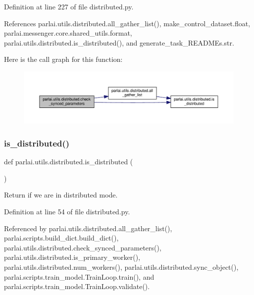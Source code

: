 Definition at line 227 of file distributed.\+py.



References parlai.\+utils.\+distributed.\+all\+\_\+gather\+\_\+list(), make\+\_\+control\+\_\+dataset.\+float, parlai.\+messenger.\+core.\+shared\+\_\+utils.\+format, parlai.\+utils.\+distributed.\+is\+\_\+distributed(), and generate\+\_\+task\+\_\+\+R\+E\+A\+D\+M\+Es.\+str.

Here is the call graph for this function\+:
\nopagebreak
\begin{figure}[H]
\begin{center}
\leavevmode
\includegraphics[width=350pt]{namespaceparlai_1_1utils_1_1distributed_afc64140f9a6437dc1a2b2bd4294ba8ef_cgraph}
\end{center}
\end{figure}
\mbox{\label{namespaceparlai_1_1utils_1_1distributed_a023acb5e3b66e1f27e21247c35661279}} 
\subsubsection{\texorpdfstring{is\+\_\+distributed()}{is\_distributed()}}
{\footnotesize\ttfamily def parlai.\+utils.\+distributed.\+is\+\_\+distributed (\begin{DoxyParamCaption}{ }\end{DoxyParamCaption})}

\begin{DoxyVerb}Return if we are in distributed mode.\end{DoxyVerb}
 

Definition at line 54 of file distributed.\+py.



Referenced by parlai.\+utils.\+distributed.\+all\+\_\+gather\+\_\+list(), parlai.\+scripts.\+build\+\_\+dict.\+build\+\_\+dict(), parlai.\+utils.\+distributed.\+check\+\_\+synced\+\_\+parameters(), parlai.\+utils.\+distributed.\+is\+\_\+primary\+\_\+worker(), parlai.\+utils.\+distributed.\+num\+\_\+workers(), parlai.\+utils.\+distributed.\+sync\+\_\+object(), parlai.\+scripts.\+train\+\_\+model.\+Train\+Loop.\+train(), and parlai.\+scripts.\+train\+\_\+model.\+Train\+Loop.\+validate().

